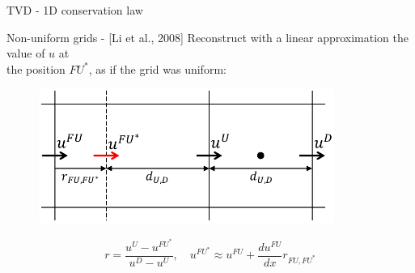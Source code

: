 \documentclass{beamer}
\begin{document}
\begin{frame}{TVD - 1D conservation law}
\begin{figure}
	\centering
	\hspace{-1cm}
	
\end{figure}
\end{frame}
\begin{frame}{Non-uniform grids - [Li et al., 2008]}
\noindent
Reconstruct with a linear approximation the value of $u$ at\\
the position $FU^*$, as if the grid was uniform:
\begin{figure}
	\centering
	\includegraphics[width=0.86\textwidth]{non_uniform_cells2.pdf}
\end{figure}
\begin{equation*}
r = \frac{u^U - u^{FU^*}}{u^D-u^U}, \quad u^{FU^*} \approx u^{FU} + 
\frac{du^{FU}}{dx}r_{FU, FU^*}
\end{equation*}
\end{frame}
\end{document}
